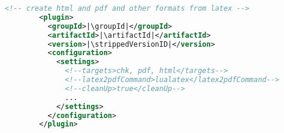 %
%
%
%
% 
%
%


\begin{lstlisting}[language=xml, basicstyle=\footnotesize,
  escapechar=|,
  float, captionpos=hb, label={lst:coordsConfig}, 
  caption={The coordinates of this plugin and some settings}]
        <!-- create html and pdf and other formats from latex -->
        <plugin>
          <groupId>|\groupId|</groupId>
          <artifactId>|\artifactId|</artifactId>
          <version>|\strippedVersionID|</version>
          <configuration>
            <settings>
              <!--targets>chk, pdf, html</targets-->
              <!--latex2pdfCommand>lualatex</latex2pdfCommand-->
              <!--cleanUp>true</cleanUp-->
              ...
            </settings>
          </configuration>
        </plugin>
  \end{lstlisting}

